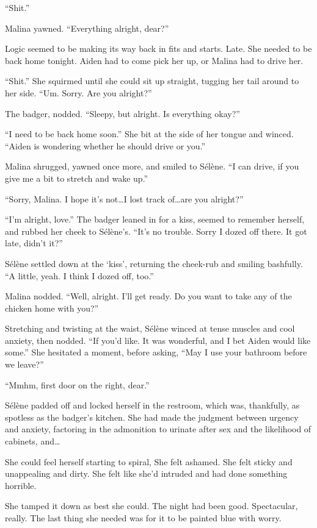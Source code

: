 ``Shit.''

Malina yawned. ``Everything alright, dear?''

Logic seemed to be making its way back in fits and starts. Late. She needed to be back home tonight. Aiden had to come pick her up, or Malina had to drive her.

``Shit.'' She squirmed until she could sit up straight, tugging her tail around to her side. ``Um. Sorry. Are you alright?''

The badger, nodded. ``Sleepy, but alright. Is everything okay?''

``I need to be back home soon.'' She bit at the side of her tongue and winced. ``Aiden is wondering whether he should drive or you.''

Malina shrugged, yawned once more, and smiled to Sélène. ``I can drive, if you give me a bit to stretch and wake up.''

``Sorry, Malina. I hope it's not\ldots{}I lost track of\ldots{}are you alright?''

``I'm alright, love.'' The badger leaned in for a kiss, seemed to remember herself, and rubbed her cheek to Sélène's. ``It's no trouble. Sorry I dozed off there. It got late, didn't it?''

Sélène settled down at the `kiss', returning the cheek-rub and smiling bashfully. ``A little, yeah. I think I dozed off, too.''

Malina nodded. ``Well, alright. I'll get ready. Do you want to take any of the chicken home with you?''

Stretching and twisting at the waist, Sélène winced at tense muscles and cool anxiety, then nodded. ``If you'd like. It was wonderful, and I bet Aiden would like some.'' She hesitated a moment, before asking, ``May I use your bathroom before we leave?''

``Mmhm, first door on the right, dear.''

Sélène padded off and locked herself in the restroom, which was, thankfully, as spotless as the badger's kitchen. She had made the judgment between urgency and anxiety, factoring in the admonition to urinate after sex and the likelihood of cabinets, and\ldots{}

She could feel herself starting to spiral, She felt ashamed. She felt sticky and unappealing and dirty. She felt like she'd intruded and had done something horrible.

She tamped it down as best she could. The night had been good. Spectacular, really. The last thing she needed was for it to be painted blue with worry.

